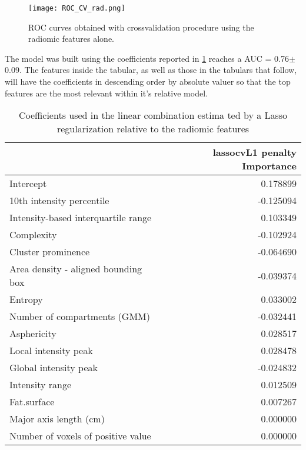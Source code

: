 \begin{figure}[htbp]
	\centering
  		\texttt{[image: ROC\_CV\_rad.png]}
        \caption{ROC curves obtained with crossvalidation procedure using the radiomic features alone. \label{RocDeathRad}}
\end{figure}

The model was built using the coefficients reported in \ref{tab:ParamRad} reaches a AUC = 0.76$\pm$0.09. The features inside the tabular, as well as those in the tabulars that follow, will have the coefficients in descending order by absolute valuer so that the top features are the most relevant within it's relative model.

\begin{table}
\caption{Coefficients used in the linear combination estima ted by a Lasso regularization relative to the radiomic features \label{tab:ParamRad}}
\centering 
	\begin{tabular}{lr}
		\toprule
		{} &  lassocvL1 penalty Importance \\
		\midrule
		Intercept                           &                      0.178899 \\
		10th intensity percentile           &                     -0.125094 \\
		Intensity-based interquartile range &                      0.103349 \\
		Complexity                          &                     -0.102924 \\
		Cluster prominence                  &                     -0.064690 \\
		Area density - aligned bounding box &                     -0.039374 \\
		Entropy                             &                      0.033002 \\
		Number of compartments (GMM)        &                     -0.032441 \\
		Asphericity                         &                      0.028517 \\
		Local intensity peak                &                      0.028478 \\
		Global intensity peak               &                     -0.024832 \\
		Intensity range                     &                      0.012509 \\
		Fat.surface                         &                      0.007267 \\
		Major axis length (cm)              &                      0.000000 \\
		Number of voxels of positive value  &                      0.000000 \\
		\bottomrule
	\end{tabular}
\end{table}

